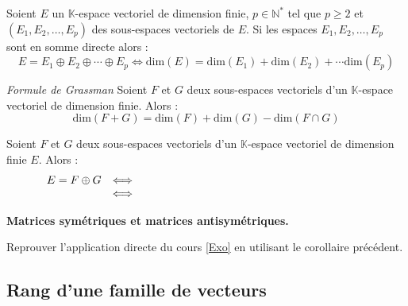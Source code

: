 \documentclass[a4paper,10pt]{report}
\begin{document}
\begin{Corollaire}{} Soient $E$ un $\mathbb{K}$-espace vectoriel de dimension finie, $p \in \mathbb{N}^*$ tel que $p \geq 2$ et $(E_1, E_2, \ldots, E_p)$ des sous-espaces vectoriels de $E$. Si les espaces $E_1, E_2, \ldots, E_p$ sont en somme directe alors :
$$ E = E_1 \oplus E_2 \oplus \cdots \oplus E_p \Longleftrightarrow  \textrm{dim}(E) = \textrm{dim}(E_1) + \textrm{dim}(E_2) + \cdots \textrm{dim}(E_p)$$
\end{Corollaire}


\begin{Proposition}{\emph{Formule de Grassman}} Soient $F$ et $G$ deux sous-espaces vectoriels d'un $\mathbb{K}$-espace vectoriel de dimension finie. Alors :
$$ \textrm{dim}(F+G) = \textrm{dim}(F) + \textrm{dim}(G) - \textrm{dim}( F \cap G)$$
\end{Proposition}

\begin{Corollaire}{} Soient $F$ et $G$ deux sous-espaces vectoriels d'un $\mathbb{K}$-espace vectoriel de dimension finie $E$. Alors :
$$ \begin{array}{ccl}
E = F \oplus G & \Longleftrightarrow & \phantom{ F \cap G = \lbrace 0_E \rbrace \hbox{ et } \textrm{dim}(E) = \textrm{dim}(F) + \textrm{dim}(G)} \\
& \Longleftrightarrow & \phantom{ F + G = E  \hbox{ et } \textrm{dim}(E) = \textrm{dim}(F) + \textrm{dim}(G)} \\
\end{array}$$
\end{Corollaire}

\begin{Exemple} \textbf{Matrices symétriques et matrices antisymétriques.}
\end{Exemple}

\vspace{14cm}
\begin{ApplicationDirecte} Reprouver l'application directe du cours \ref{Exo} en utilisant le corollaire précédent.
\end{ApplicationDirecte}

\subsection{Rang d'une famille de vecteurs}
\end{document}
